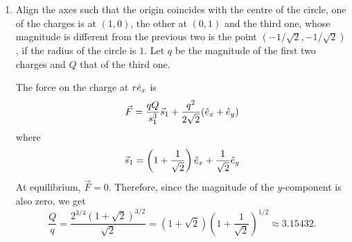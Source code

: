 \documentclass{article}
\begin{document}
\begin{enumerate}
\item Align the axes such that the origin coincides with the centre of the circle,
one of the charges is at $(1, 0)$, the other at $(0, 1)$ and the third one, whose
magnitude is different from the previous two is the point $(-1/\sqrt{2}, 
-1/\sqrt{2})$, if the radius of the circle is $1$. Let $q$ be the magnitude of
the first two charges and $Q$ that of the third one. 

The force on the charge at $r\hat{e}_{x}$ is
\[
\vec{F} = \frac{qQ}{s_1^3}\vec{s}_1 + \frac{q^2}{2\sqrt{2}}(\hat{e}_{x} + \hat{e}_{y})
\]
where
\[
\vec{s}_1 = \left(1 + \frac{1}{\sqrt{2}}\right)\hat{e}_{x} + \frac{1}{\sqrt{2}}\hat{e}_{y}
\]
At equilibrium, $\vec{F} = 0$. Therefore, since the magnitude of the $y$-component
is also zero, we get
\[
\frac{Q}{q} = \frac{2^{3/4}(1 + \sqrt{2})^{3/2}}{\sqrt{2}} = 
(1 + \sqrt{2})\left(1 + \frac{1}{\sqrt{2}}\right)^{1/2} \approx 3.15432.
\]
\end{enumerate}
\end{document}

